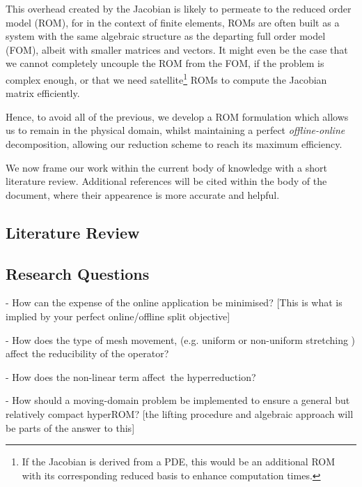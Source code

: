 \documentclass[thesis.tex]{subfiles}
\begin{document}
This overhead created by the Jacobian is likely to permeate to the reduced order model (ROM),
for in the context of finite elements, ROMs are often built as a system with the same algebraic structure
as the departing full order model (FOM),
albeit with smaller matrices and vectors. 
It might even be the case that we cannot completely uncouple the ROM from the FOM, 
if the problem is complex enough, or that we need satellite\footnote
{
    If the Jacobian is derived from a PDE, 
    this would be an additional ROM with its corresponding reduced basis to 
    enhance computation times.
} ROMs to compute the Jacobian matrix efficiently.

Hence, to avoid all of the previous, 
we develop a ROM formulation which allows us to remain in the physical domain, 
whilst maintaining a perfect \textit{offline-online} decomposition,
allowing our reduction scheme to reach its maximum efficiency.


We now frame our work within the current body of knowledge 
with a short literature review.
Additional references will be cited within the body of the document, 
where their appearence is more accurate and helpful.  

\subsection{Literature Review}


\subsection{Research Questions}
- How can the expense of the online application be minimised? 
[This is what is implied by your perfect online/offline split objective]

- How does the type of mesh movement, 
(e.g. uniform or non-uniform stretching ) affect the reducibility of the operator?

- How does the non-linear term affect the hyperreduction?

- How should a moving-domain problem be implemented to 
ensure a general but relatively compact hyperROM? 
[the lifting procedure and algebraic approach will be parts of the answer to this]
\end{document}
